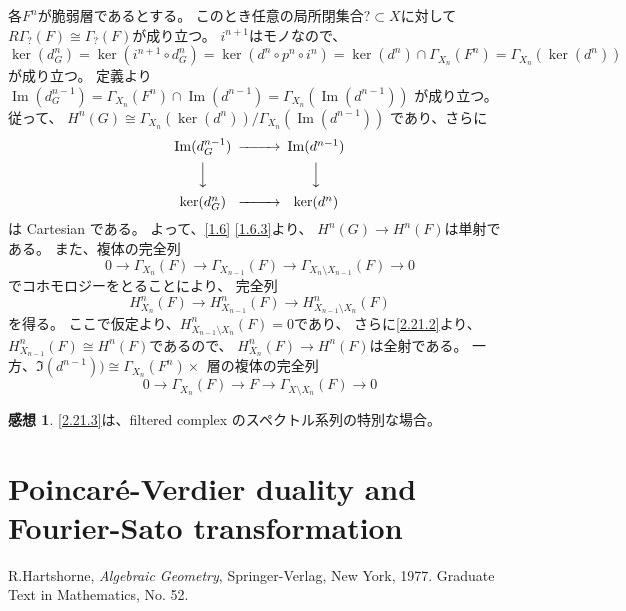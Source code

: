 \documentclass[uplatex,dvipdfmx]{jsarticle}
\makeatletter
\theoremstyle{definition}
\newtheorem*{kansou*}{感想}
\renewenvironment{proof}[1][\proofname]{
  \pushQED{\qed}%
  \normalfont \topsep6\p@\@plus6\p@\relax
  \trivlist
  \item[\hskip\labelsep
    #1\@addpunct{\textbf{.}}]\ignorespaces
}{%
  \popQED\endtrivlist\@endpefalse
}
\providecommand{\proofname}{証明}
\DeclareMathOperator{\im}{\mathrm{Im}}
\makeatother
\begin{document}
\begin{proof}
  各\(F^n\)が脆弱層であるとする。
  このとき任意の局所閉集合\(?\subset X\)に対して
  \(R\Gamma_{?}(F)\cong \Gamma_{?}(F)\)が成り立つ。
  \(i^{n+1}\)はモノなので、
  \[
  \ker(d_G^n) = \ker(i^{n+1}\circ d_G^n) = \ker(d^n\circ p^n \circ i^n)
  = \ker(d^n)\cap \Gamma_{X_n}(F^n) = \Gamma_{X_n}(\ker(d^n))
  \]
  が成り立つ。
  定義より
  \(\im(d_G^{n-1}) = \Gamma_{X_n}(F^n)\cap \im(d^{n-1}) = \Gamma_{X_n}(\im(d^{n-1}))\)
  が成り立つ。
  従って、
  \(H^n(G) \cong \Gamma_{X_n}(\ker(d^n))/\Gamma_{X_n}(\im(d^{n-1}))\)
  であり、さらに
  \[
  \begin{CD}
    \im(d_G^{n-1}) @>>> \im(d^{n-1}) \\
    @VVV @VVV \\
    \ker(d_G^n) @>>> \ker(d^n)
  \end{CD}
  \]
  は Cartesian である。
  よって、\autoref{1.6} \ref{1.6.3}より、
  \(H^n(G) \to H^n(F)\)は単射である。
  また、複体の完全列
  \[
  0\to \Gamma_{X_n}(F) \to \Gamma_{X_{n-1}}(F) \to
  \Gamma_{X_n\setminus X_{n-1}}(F) \to 0
  \]
  でコホモロジーをとることにより、
  完全列
  \[
  H^n_{X_n}(F) \to H^n_{X_{n-1}}(F) \to H^n_{X_{n-1}\setminus X_n}(F)
  \]
  を得る。
  ここで仮定より、\(H^n_{X_{n-1}\setminus X_n}(F) = 0\)であり、
  さらに\ref{2.21.2}より、\(H^n_{X_{n-1}}(F)\cong H^n(F)\)であるので、
  \(H^n_{X_n}(F) \to H^n(F)\)は全射である。
  一方、\(\Im(d^{n-1})) \cong \Gamma_{X_n}(F^n)\times_{} \)
  層の複体の完全列
  \[
  0 \to \Gamma_{X_n}(F) \to F\to \Gamma_{X\setminus X_n}(F) \to 0
  \]

\end{proof}

\begin{kansou*}
  \ref{2.21.3}は、filtered complex のスペクトル系列の特別な場合。
\end{kansou*}

\newpage
\section{Poincar\'{e}-Verdier duality and Fourier-Sato transformation}

\begin{thebibliography}{9}
  R.Hartshorne,
  \textit{Algebraic Geometry},
  Springer-Verlag,
  New York, 1977.
  Graduate Text in Mathematics, No. 52.
\end{thebibliography}
\end{document}

